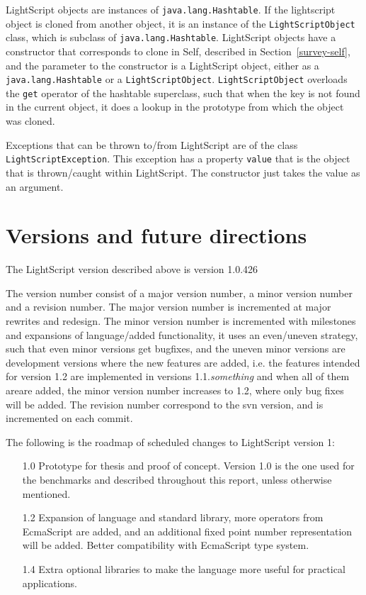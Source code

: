 \documentclass[11pt]{report}
\begin{document}
LightScript objects are instances of \verb|java.lang.Hashtable|. If the lightscript object is cloned from another object, it is an instance of the \verb|LightScriptObject| class, which is subclass of \verb|java.lang.Hashtable|. LightScript objects have a constructor that corresponds to clone in Self, described in Section~\ref{survey-self}, and the parameter to the constructor is a LightScript object, either as a \verb|java.lang.Hashtable| or a \verb|LightScriptObject|. \verb|LightScriptObject| overloads the \verb|get| operator of the hashtable superclass, such that when the key is not found in the current object, it does a lookup in the prototype from which the object was cloned.

Exceptions that can be thrown to/from LightScript are of the class \verb|LightScriptException|. This exception has a property \verb|value| that is the object that is thrown/caught within LightScript. The constructor just takes the value as an argument.

\section{Versions and future directions}
The LightScript version described above is version 1.0.426

The version number consist of a major version number, a minor version number and a revision number.
The major version number is incremented at major rewrites and redesign.
The minor version number is incremented with milestones and expansions of language/added functionality, it uses an even/uneven strategy, such that even minor versions get bugfixes, and the uneven minor versions are development versions where the new features are added, i.e. 
the features intended for version 1.2 are implemented in versions 1.1.\emph{something} and when all of them areare  added, the minor version number increases to 1.2, where only bug fixes will be added.
The revision number correspond to the svn version, and is incremented on each commit.

The following is the roadmap of scheduled changes to LightScript version 1:
\begin{itemize}
\item[1.0]
Prototype for thesis and proof of concept.
Version 1.0 is the one used for the benchmarks and described throughout this report, unless otherwise mentioned. 
\item[1.2]
Expansion of language and standard library, more operators from EcmaScript are added,
and an additional fixed point number representation will be added. Better compatibility with EcmaScript type system.
\item[1.4]
Extra optional libraries to make the language more useful for practical applications.
\end{itemize}
\end{document}
